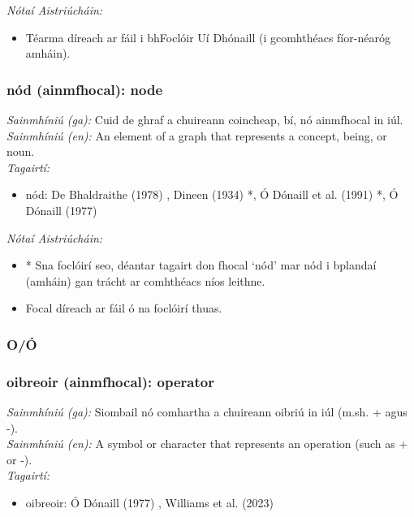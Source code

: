  \noindent \textit{Nótaí Aistriúcháin:}
\begin{itemize}
	\item Téarma díreach ar fáil i bhFoclóir Uí Dhónaill (i gcomhthéacs fíor-néaróg amháin).
\end{itemize}


\subsubsection*{nód (ainmfhocal): node}
 \noindent \textit{Sainmhíniú (ga):} Cuid de ghraf a chuireann coincheap, bí, nó ainmfhocal in iúl.
\\
 \noindent \textit{Sainmhíniú (en):} An element of a graph that represents a concept, being, or noun.
\\
 \noindent \textit{Tagairtí:}
\begin{itemize}
	\item nód: De Bhaldraithe (1978) \cite{de-bhaldraithe}, Dineen (1934) \cite{dineen}*, Ó Dónaill et al. (1991) \cite{focloir-beag}*, Ó Dónaill (1977) \cite{odonaill}
\end{itemize}

 \noindent \textit{Nótaí Aistriúcháin:}
\begin{itemize}
	\item * Sna foclóirí seo, déantar tagairt don fhocal `nód' mar nód i bplandaí (amháin) gan trácht ar comhthéacs níos leithne.
	\item Focal díreach ar fáil ó na foclóirí thuas.
\end{itemize}


 \subsubsection*{O/Ó}

\subsubsection*{oibreoir (ainmfhocal): operator}
 \noindent \textit{Sainmhíniú (ga):} Siombail nó comhartha a chuireann oibriú in iúl (m.sh. + agus -).
\\
 \noindent \textit{Sainmhíniú (en):} A symbol or character that represents an operation (such as + or -).
\\
 \noindent \textit{Tagairtí:}
\begin{itemize}
	\item oibreoir: Ó Dónaill (1977) \cite{odonaill}, Williams et al. (2023) \cite{storchiste}
\end{itemize}

